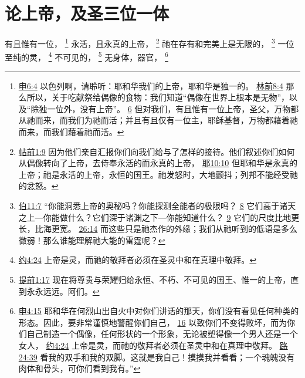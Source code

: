 \documentclass[12pt, a4paper, oneside]{ctexart}
\newcounter{parnum}[section]
\newcommand{\N}{%
   \noindent\refstepcounter{parnum}%
    \makebox[\parindent][l]{\textbf{\arabic{parnum}.}}}
\begin{document}
\section{论上帝，及圣三位一体}

\N 有且惟有一位，
	\footnote {
		\href{https://biblehub.com/deuteronomy/6-4.htm}{申6:4} 以色列啊，请聆听：耶和华我们的上帝，耶和华是独一的。
		\href{https://biblehub.com/1_corinthians/8-4.htm}{林前8:4} 那么所以，关于吃献祭给偶像的食物：我们知道“偶像在世界上根本是无物”，以及“除独一位外，没有上帝”。
		\href{https://biblehub.com/1_corinthians/8-6.htm}{6} 但对我们，有且惟有一位上帝，圣父，万物都从祂而来，而我们为祂而活；并且有且仅有一位主，耶稣基督，万物都藉着祂而来，而我们藉着祂而活。
	}
	永活，且永真的上帝，
	\footnote {
		\href{https://biblehub.com/1_thessalonians/1-9.htm}{帖前1:9} 因为他们亲自汇报你们向我们给与了怎样的接待。他们叙述你们如何从偶像转向了上帝，去侍奉永活的而永真的上帝，
		\href{https://biblehub.com/jeremiah/10-10.htm}{耶10:10} 但耶和华是永真的上帝；祂是永活的上帝，永恒的国王。祂发怒时，大地颤抖；列邦不能经受祂的忿怒。
	}
	祂在存有和完美上是无限的，
	\footnote {
		\href{https://biblehub.com/job/11-7.htm}{伯11:7} “你能洞悉上帝的奥秘吗？你能探测全能者的极限吗？
		\href{https://biblehub.com/job/11-8.htm}{8} 它们高于诸天之上---你能做什么？它们深于诸渊之下---你能知道什么？
		\href{https://biblehub.com/job/11-9.htm}{9} 它们的尺度比地更长，比海更宽。
		\href{https://biblehub.com/job/26-14.htm}{26:14} 而这些只是祂杰作的外缘；我们从祂听到的低语是多么微弱！那么谁能理解祂大能的雷霆呢？
	}
	一位至纯的灵，
	\footnote {
		\href{https://biblehub.com/john/4-24.htm}{约4:24} 上帝是灵，而祂的敬拜者必须在圣灵中和在真理中敬拜。
	}
	不可见的，
	\footnote {
		\href{https://biblehub.com/1_timothy/1-17.htm}{提前1:17} 现在将尊贵与荣耀归给永恒、不朽、不可见的国王、惟一的上帝，直到永永远远。阿们。
	}
	无身体，器官，
	\footnote {
		\href{https://biblehub.com/deuteronomy/4-15.htm}{申4:15} 耶和华在何烈山出自火中对你们讲话的那天，你们没有看见任何种类的形态。因此，要非常谨慎地警醒你们自己，
		\href{https://biblehub.com/deuteronomy/4-16.htm}{16} 以致你们不变得败坏，而为你们自己制造一个偶像，任何形状的一个形象，无论被塑得像一个男人还是一个女人，
		\href{https://biblehub.com/john/4-24.htm}{约4:24} 上帝是灵，而祂的敬拜者必须在圣灵中和在真理中敬拜。
		\href{https://biblehub.com/luke/24-39.htm}{路24:39} 看我的双手和我的双脚。这就是我自己！摸摸我并看看；一个魂魄没有肉体和骨头，可你们看到我有。”
	}
\end{document}
